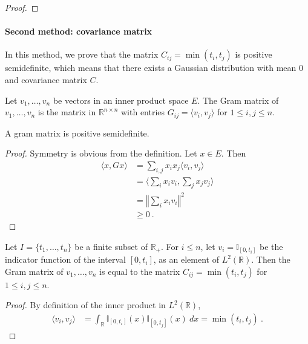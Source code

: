 \begin{proof}

\end{proof}


\paragraph{Second method: covariance matrix}

In this method, we prove that the matrix $C_{ij} = \min(t_i, t_j)$ is positive semidefinite, which means that there exists a Gaussian distribution with mean 0 and covariance matrix $C$.

\begin{definition}\label{def:gramMatrix}
Let $v_1, \ldots, v_n$ be vectors in an inner product space $E$.
The Gram matrix of $v_1, \ldots, v_n$ is the matrix in $\mathbb{R}^{n \times n}$ with entries $G_{ij} = \langle v_i, v_j \rangle$ for $1 \leq i,j \leq n$.
\end{definition}


\begin{lemma}\label{lem:posSemidef_gramMatrix}
A gram matrix is positive semidefinite.
\end{lemma}

\begin{proof}
Symmetry is obvious from the definition.
Let $x \in E$. Then
\begin{align*}
  \langle x, G x \rangle
  &= \sum_{i,j} x_i x_j \langle v_i, v_j \rangle
  \\
  &= \langle \sum_i x_i v_i, \sum_j x_j v_j \rangle
  \\
  &= \left\Vert \sum_i x_i v_i \right\Vert^2
  \\
  &\ge 0
  \: .
\end{align*}
\end{proof}


\begin{lemma}\label{lem:C_eq_gramMatrix}
Let $I = \{t_1, \ldots, t_n\}$ be a finite subset of $\mathbb{R}_+$.
For $i \le n$, let $v_i = \mathbb{I}_{[0, t_i]}$ be the indicator function of the interval $[0, t_i]$, as an element of $L^2(\mathbb{R})$.
Then the Gram matrix of $v_1, \ldots, v_n$ is equal to the matrix $C_{ij} = \min(t_i, t_j)$ for $1 \leq i,j \leq n$.
\end{lemma}

\begin{proof}
By definition of the inner product in $L^2(\mathbb{R})$,
\begin{align*}
  \langle v_i, v_j \rangle
  &= \int_{\mathbb{R}} \mathbb{I}_{[0, t_i]}(x) \mathbb{I}_{[0, t_j]}(x) \: dx
  = \min(t_i, t_j)
  \: .
\end{align*}
\end{proof}


